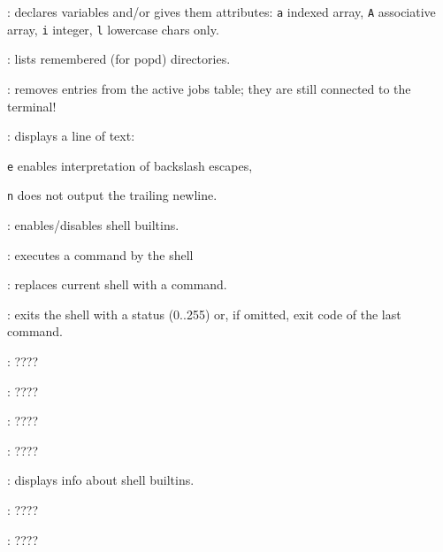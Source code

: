 \begin{compactenum}
\item [\symbolbash] : declares variables and/or gives them attributes: \texttt{a} indexed array, \texttt{A} associative array, \texttt{i} integer, \texttt{l} lowercase chars only.

\item [\symbolbash] : lists remembered (for popd) directories.

\item [\symbolbash] : removes entries from the active jobs table; they are still connected to the terminal!

\item [\symbolbash] : displays a line of text:
\item [\texttt{e}] enables interpretation of backslash escapes,
\item [\texttt{n}] does not output the trailing newline.

\item [\symbolbash] : enables/disables shell builtins.

\item [\symbolbash] : executes a command by the shell

\item [\symbolbash] : replaces current shell with a command.

\item [\symbolbash] : exits the shell with a status (0..255) or, if omitted, exit code of the last command.

\item [\symbolbash] : \dotfill ????

\item [\symbolbash] : \dotfill ????

\item [\symbolbash] : \dotfill ????

\item [\symbolbash] : \dotfill ????

\item [\symbolbash] : displays info about shell builtins.

\item [\symbolbash] : \dotfill ????

\item [\symbolbash] : \dotfill ????


\end{compactenum}
